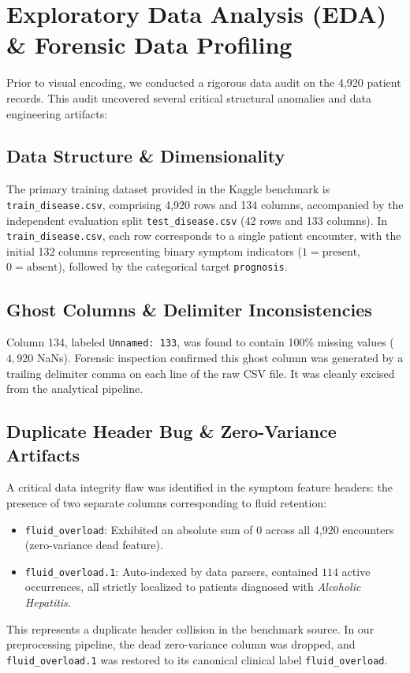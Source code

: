 \documentclass[conference]{IEEEtran}
\begin{document}
\section{Exploratory Data Analysis (EDA) \& Forensic Data Profiling}
Prior to visual encoding, we conducted a rigorous data audit on the 4,920 patient records. This audit uncovered several critical structural anomalies and data engineering artifacts:

\subsection{Data Structure \& Dimensionality}
The primary training dataset provided in the Kaggle benchmark is \texttt{train\_disease.csv}, comprising 4,920 rows and 134 columns, accompanied by the independent evaluation split \texttt{test\_disease.csv} (42 rows and 133 columns). In \texttt{train\_disease.csv}, each row corresponds to a single patient encounter, with the initial 132 columns representing binary symptom indicators ($1 = \text{present}$, $0 = \text{absent}$), followed by the categorical target \texttt{prognosis}.

\subsection{Ghost Columns \& Delimiter Inconsistencies}
Column 134, labeled \texttt{Unnamed: 133}, was found to contain 100\% missing values ($4,920$ NaNs). Forensic inspection confirmed this ghost column was generated by a trailing delimiter comma on each line of the raw CSV file. It was cleanly excised from the analytical pipeline.

\subsection{Duplicate Header Bug \& Zero-Variance Artifacts}
A critical data integrity flaw was identified in the symptom feature headers: the presence of two separate columns corresponding to fluid retention:
\begin{itemize}[noitemsep]
    \item \texttt{fluid\_overload}: Exhibited an absolute sum of $0$ across all 4,920 encounters (zero-variance dead feature).
    \item \texttt{fluid\_overload.1}: Auto-indexed by data parsers, contained $114$ active occurrences, all strictly localized to patients diagnosed with \textit{Alcoholic Hepatitis}.
\end{itemize}
This represents a duplicate header collision in the benchmark source. In our preprocessing pipeline, the dead zero-variance column was dropped, and \texttt{fluid\_overload.1} was restored to its canonical clinical label \texttt{fluid\_overload}.
\end{document}
